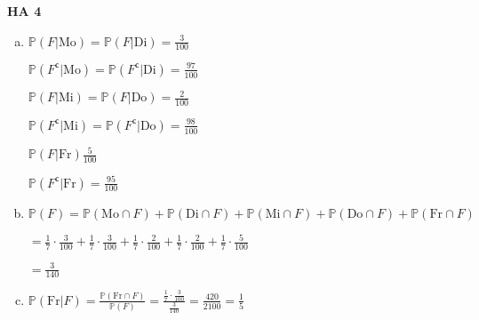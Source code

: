 \documentclass[a4paper,12pt]{article}
\newcommand{\Aufgabe}[1]{
        {
        \vspace*{0.5cm}
        \textbf{HA #1}
        \vspace*{0.2cm}
    }
}
\begin{document}
    \Aufgabe{4}
    \begin{enumerate}[(a)]
        \item

        $ \displaystyle \mathbb{P}(F | \text{Mo}) = \mathbb{P}(F | \text{Di}) = \frac{3}{100} $

        $ \displaystyle \mathbb{P}(F^{\mathsf{c}} | \text{Mo}) = \mathbb{P}(F^{\mathsf{c}} | \text{Di}) = \frac{97}{100} $

        $ \displaystyle \mathbb{P}(F | \text{Mi}) = \mathbb{P}(F | \text{Do}) = \frac{2}{100} $

        $ \displaystyle \mathbb{P}(F^{\mathsf{c}} | \text{Mi}) = \mathbb{P}(F^{\mathsf{c}} | \text{Do}) = \frac{98}{100} $

        $ \displaystyle \mathbb{P}(F | \text{Fr}) \frac{5}{100} $

        $ \displaystyle \mathbb{P}(F^{\mathsf{c}} | \text{Fr}) = \frac{95}{100} $

        \newpage 

        \item

        $ \displaystyle\mathbb{P}(F) = \mathbb{P}(\text{Mo} \cap F) + \mathbb{P}(\text{Di} \cap F) + \mathbb{P}(\text{Mi} \cap F) + \mathbb{P}(\text{Do} \cap F) + \mathbb{P}(\text{Fr} \cap F)  $
        
        $ \displaystyle = \frac{1}{7} \cdot \frac{3}{100} + \frac{1}{7} \cdot \frac{3}{100} + \frac{1}{7} \cdot \frac{2}{100} + \frac{1}{7} \cdot \frac{2}{100} + \frac{1}{7} \cdot \frac{5}{100} $

        $ \displaystyle = \frac{3}{140} $

        \item

        $ \displaystyle \mathbb{P}(\text{Fr} | F) = \frac{\mathbb{P}(\text{Fr} \cap F)}{\mathbb{P}(F)} = \frac{\frac{1}{7} \cdot \frac{3}{100}}{\frac{3}{140}} = \frac{420}{2100} = \frac{1}{5} $
    \end{enumerate}
\end{document}
